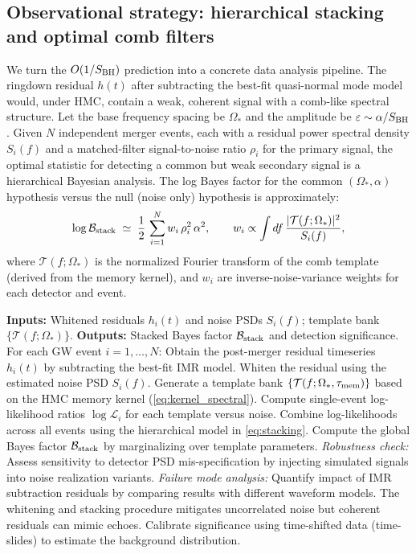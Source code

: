 \documentclass[11pt,a4paper]{article}
\newcommand{\HMC}{\textsc{HMC}\xspace}
\theoremstyle{plain}
\theoremstyle{definition}
\theoremstyle{remark}
\begin{document}
\subsection{Observational strategy: hierarchical stacking and optimal comb filters}
\label{ssec:obs}
We turn the $O(1/S_{\rm BH})$ prediction into a concrete data analysis pipeline. The ringdown residual $h(t)$ after subtracting the best-fit quasi-normal mode model would, under \HMC{}, contain a weak, coherent signal with a comb-like spectral structure. Let the base frequency spacing be $\Omega_\ast$ and the amplitude be $\varepsilon\sim \alpha/S_{\rm BH}$. Given $N$ independent merger events, each with a residual power spectral density $S_i(f)$ and a matched-filter signal-to-noise ratio $\rho_i$ for the primary signal, the optimal statistic for detecting a common but weak secondary signal is a hierarchical Bayesian analysis. The log Bayes factor for the common $(\Omega_\ast,\alpha)$ hypothesis versus the null (noise only) hypothesis is approximately:
\begin{equation}
\log \mathcal{B}_{\rm stack}\;\simeq\; \frac{1}{2}\,\sum_{i=1}^N w_i\, \rho_i^2\,\alpha^2,
\qquad
w_i \propto \int df\,\frac{|\mathcal{T}(f;\Omega_\ast)|^2}{S_i(f)},
\label{eq:stacking}
\end{equation}
where $\mathcal{T}(f;\Omega_\ast)$ is the normalized Fourier transform of the comb template (derived from the memory kernel), and $w_i$ are inverse-noise-variance weights for each detector and event.

\begin{algorithm}[t!]
\caption{Comb matched-filter search for \HMC{} echoes.}
\label{alg:combfilter}
\begin{algorithmic}[1]
\State \textbf{Inputs:} Whitened residuals $h_i(t)$ and noise PSDs $S_i(f)$; template bank $\{\mathcal{T}(f;\Omega_\ast)\}$.
\State \textbf{Outputs:} Stacked Bayes factor $\mathcal{B}_{\rm stack}$ and detection significance.
\State For each GW event $i=1,\dots,N$:
\State \quad Obtain the post-merger residual timeseries $h_i(t)$ by subtracting the best-fit IMR model.
\State \quad Whiten the residual using the estimated noise PSD $S_i(f)$.
\State \quad Generate a template bank $\{\mathcal{T}(f;\Omega_\ast, \tau_{\rm mem})\}$ based on the \HMC{} memory kernel (\eqref{eq:kernel_spectral}).
\State \quad Compute single-event log-likelihood ratios $\log\mathcal{L}_i$ for each template versus noise.
\State Combine log-likelihoods across all events using the hierarchical model in \eqref{eq:stacking}.
\State Compute the global Bayes factor $\mathcal{B}_{\rm stack}$ by marginalizing over template parameters.
\State \quad \textit{Robustness check:} Assess sensitivity to detector PSD mis-specification by injecting simulated signals into noise realization variants.
\State \quad \textit{Failure mode analysis:} Quantify impact of IMR subtraction residuals by comparing results with different waveform models. The whitening and stacking procedure mitigates uncorrelated noise but coherent residuals can mimic echoes.
\State Calibrate significance using time-shifted data (time-slides) to estimate the background distribution.
\end{algorithmic}
\end{algorithm}
\end{document}
